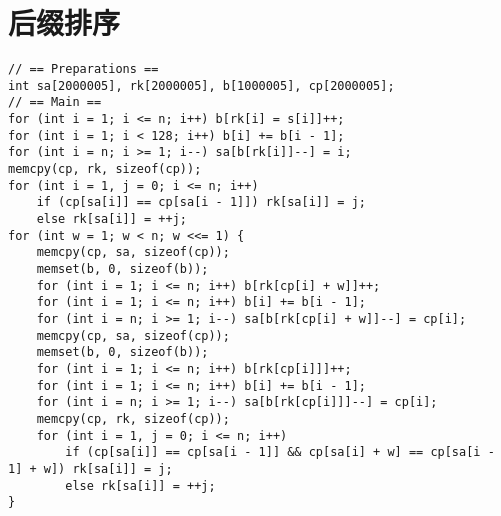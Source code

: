 \section{后缀排序}

\begin{verbatim}
// == Preparations ==
int sa[2000005], rk[2000005], b[1000005], cp[2000005];
// == Main ==
for (int i = 1; i <= n; i++) b[rk[i] = s[i]]++;
for (int i = 1; i < 128; i++) b[i] += b[i - 1];
for (int i = n; i >= 1; i--) sa[b[rk[i]]--] = i;
memcpy(cp, rk, sizeof(cp));
for (int i = 1, j = 0; i <= n; i++)
    if (cp[sa[i]] == cp[sa[i - 1]]) rk[sa[i]] = j;
    else rk[sa[i]] = ++j;
for (int w = 1; w < n; w <<= 1) {
    memcpy(cp, sa, sizeof(cp));
    memset(b, 0, sizeof(b));
    for (int i = 1; i <= n; i++) b[rk[cp[i] + w]]++;
    for (int i = 1; i <= n; i++) b[i] += b[i - 1];
    for (int i = n; i >= 1; i--) sa[b[rk[cp[i] + w]]--] = cp[i];
    memcpy(cp, sa, sizeof(cp));
    memset(b, 0, sizeof(b));
    for (int i = 1; i <= n; i++) b[rk[cp[i]]]++;
    for (int i = 1; i <= n; i++) b[i] += b[i - 1];
    for (int i = n; i >= 1; i--) sa[b[rk[cp[i]]]--] = cp[i];
    memcpy(cp, rk, sizeof(cp));
    for (int i = 1, j = 0; i <= n; i++)
        if (cp[sa[i]] == cp[sa[i - 1]] && cp[sa[i] + w] == cp[sa[i - 1] + w]) rk[sa[i]] = j;
        else rk[sa[i]] = ++j;
}
\end{verbatim}